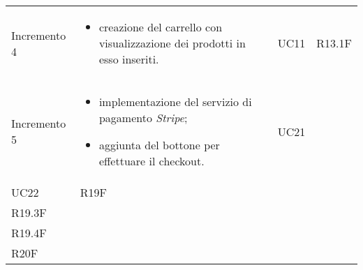 \begin{longtable}{
    >{\centering}p{}
    >{\raggedright}p{}
    >{\centering}p{}
    >{\centering}p{}
    }
    Incremento 4                  & \vspace{-15px}
    \begin{itemize}
        \renewcommand\labelitemi{-}
        \item creazione del carrello con visualizzazione dei prodotti in esso inseriti.
    \end{itemize}     & UC11                           & R13.1F
    \tabularnewline

    Incremento 5                  & \vspace{-15px}
    \begin{itemize}
        \renewcommand\labelitemi{-}
        \item implementazione del servizio di pagamento \textit{Stripe};
        \item aggiunta del bottone per effettuare il checkout.
    \end{itemize}     & UC21                                                                                          \\ UC22                           & R19F                         \\ R19.3F \\ R19.4F \\ R20F
    \tabularnewline
\end{longtable}
\renewcommand{\arraystretch}{1}
